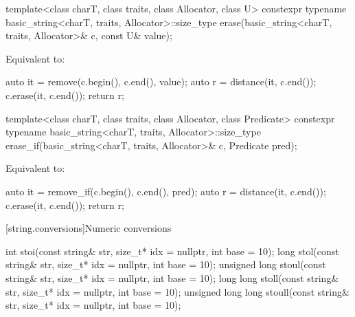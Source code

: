 %
\begin{itemdecl}
template<class charT, class traits, class Allocator, class U>
  constexpr typename basic_string<charT, traits, Allocator>::size_type
    erase(basic_string<charT, traits, Allocator>& c, const U& value);
\end{itemdecl}

\begin{itemdescr}
\pnum
\effects
Equivalent to:
\begin{codeblock}
auto it = remove(c.begin(), c.end(), value);
auto r = distance(it, c.end());
c.erase(it, c.end());
return r;
\end{codeblock}
\end{itemdescr}

%
\begin{itemdecl}
template<class charT, class traits, class Allocator, class Predicate>
  constexpr typename basic_string<charT, traits, Allocator>::size_type
    erase_if(basic_string<charT, traits, Allocator>& c, Predicate pred);
\end{itemdecl}

\begin{itemdescr}
\pnum
\effects
Equivalent to:
\begin{codeblock}
auto it = remove_if(c.begin(), c.end(), pred);
auto r = distance(it, c.end());
c.erase(it, c.end());
return r;
\end{codeblock}
\end{itemdescr}

[string.conversions]{Numeric conversions}

%
%
%
%
%
\begin{itemdecl}
int stoi(const string& str, size_t* idx = nullptr, int base = 10);
long stol(const string& str, size_t* idx = nullptr, int base = 10);
unsigned long stoul(const string& str, size_t* idx = nullptr, int base = 10);
long long stoll(const string& str, size_t* idx = nullptr, int base = 10);
unsigned long long stoull(const string& str, size_t* idx = nullptr, int base = 10);
\end{itemdecl}

